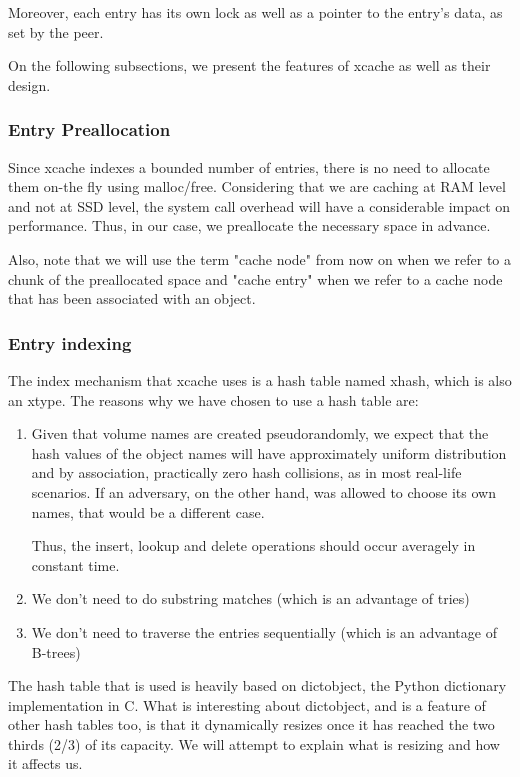 Moreover, each entry has its own lock as well as a pointer to the entry's data, 
as set by the peer.

On the following subsections, we present the features of xcache as well as 
their design.

\subsubsection{Entry Preallocation}\label{sec:xcache-entry-design}

Since xcache indexes a bounded number of entries, there is no need to allocate 
them on-the fly using malloc/free. Considering that we are caching at RAM level 
and not at SSD level, the system call overhead will have a considerable impact 
on performance. Thus, in our case, we preallocate the necessary space in 
advance.

Also, note that we will use the term "cache node" from now on when we refer to 
a chunk of the preallocated space and "cache entry" when we refer to a cache 
node that has been associated with an object.

\subsubsection{Entry indexing}\label{sec:xcache-index-design}

The index mechanism that xcache uses is a hash table named xhash, which is also 
an xtype. The reasons why we have chosen to use a hash table are:

\begin{enumerate}
	\item Given that volume names are created pseudorandomly, we expect 
		that the hash values of the object names will have 
		approximately uniform distribution and by association, 
		practically zero hash collisions, as in most real-life 
		scenarios. If an adversary, on the other hand, was allowed to 
		choose its own names, that would be a different case.

		Thus, the insert, lookup and delete operations should occur 
		averagely in constant time.
	\item We don't need to do substring matches (which is an advantage of 
		tries)
	\item We don't need to traverse the entries sequentially (which is an 
		advantage of B-trees)
\end{enumerate}

The hash table that is used is heavily based on dictobject\cite{dictobject},
the Python dictionary implementation in C. What is interesting about 
dictobject, and is a feature of other hash tables too, is that it dynamically
resizes once it has reached the two thirds (2/3) of its capacity. We will 
attempt to explain what is resizing and how it affects us.

